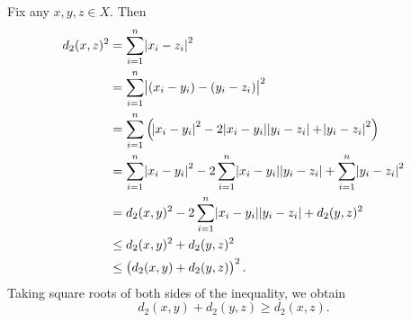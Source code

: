\documentclass{article}
\begin{document}
Fix any $x, y, z \in X$. Then
%
\begin{align*}
    d_2(x, z)^2
        &= \sum_{i = 1}^n \envert{x_i - z_i}^2 \\
        &= \sum_{i = 1}^n \envert{(x_i - y_i) - (y_i - z_i)}^2 \\
        &= \sum_{i = 1}^n
            \del{
                \envert{x_i - y_i}^2
                - 2 \envert{x_i - y_i} \envert{y_i - z_i}
                + \envert{y_i - z_i}^2
            } \\
        &= \sum_{i = 1}^n \envert{x_i - y_i}^2
           - 2 \sum_{i = 1}^n \envert{x_i - y_i} \envert{y_i - z_i}
           + \sum_{i = 1}^n \envert{y_i - z_i}^2 \\
        &= d_2(x, y)^2
           - 2 \sum_{i = 1}^n \envert{x_i - y_i} \envert{y_i - z_i}
           + d_2(y, z)^2 \\
        &\leq d_2(x, y)^2 + d_2(y, z)^2 \\
        &\leq \del{d_2(x, y) + d_2(y, z)}^2
    .
\end{align*}
%
Taking square roots of both sides of the inequality, we obtain
%
\begin{equation*}
    d_2(x, y) + d_2(y, z) \geq d_2(x, z)
    .
\end{equation*}

\newpage
\end{document}
